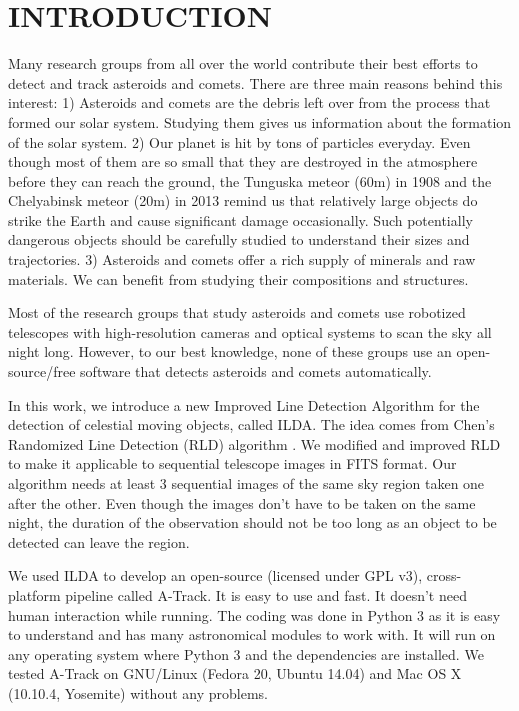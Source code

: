 \documentclass[review]{elsarticle}
\begin{document}

\section{INTRODUCTION}
Many research groups from all over the world contribute their best efforts to detect and track asteroids and comets. There are three main reasons behind this interest:
1) Asteroids and comets are the debris left over from the process that formed our solar system. Studying them gives us information about the formation of the solar system.
2) Our planet is hit by tons of particles everyday. Even though most of them are so small that they are destroyed in the atmosphere before they can reach the ground, the Tunguska meteor (60m) in 1908 \citep{Lyne1995} and the Chelyabinsk meteor (20m) in 2013 \citep{Popova1069} remind us that relatively large objects do strike the Earth and cause significant damage occasionally. Such potentially dangerous objects should be carefully studied to understand their sizes and trajectories.
3) Asteroids and comets offer a rich supply of minerals and raw materials. We can benefit from studying their compositions and structures.

Most of the research groups that study asteroids and comets use robotized telescopes with high-resolution cameras and optical systems to scan the sky all night long. However, to our best knowledge, none of these groups use an open-source/free software that detects asteroids and comets automatically.

In this work, we introduce a new Improved Line Detection Algorithm for the detection of celestial moving objects, called ILDA. The idea comes from Chen's Randomized Line Detection (RLD) algorithm \citep{chen2001}. We modified and improved RLD to make it applicable to sequential telescope images in FITS format. Our algorithm needs at least 3 sequential images of the same sky region taken one after the other. Even though the images don't have to be taken on the same night, the duration of the observation should not be too long as an object to be detected can leave the region.

We used ILDA to develop an open-source (licensed under GPL v3), cross-platform pipeline called A-Track. It is easy to use and fast. It doesn't need human interaction while running. The coding was done in Python 3 as it is easy to understand and has many astronomical modules to work with. It will run on any operating system where Python 3 and the dependencies are installed. We tested A-Track on GNU/Linux (Fedora 20, Ubuntu 14.04) and Mac OS X (10.10.4, Yosemite) without any problems.
\end{document}
